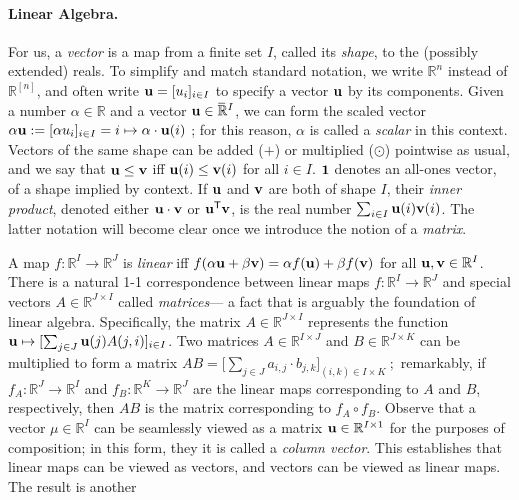 
\paragraph{Linear Algebra.}
For us, a \emph{vector} is a map from a finite set $I$, called its 
\emph{shape}, to the (possibly extended) reals.
To simplify and match standard notation, we write $\mathbb R^n$ instead of $\mathbb R^{[n]}$, and often write $\mathbf u = [u_i]_{i \in I}$ to specify a vector $\mathbf u$ by its components.
Given a number $\alpha \in \mathbb R$ and a vector $\mathbf u \in \mskip1mu\overline{\mskip-1mu\mathbb R\!}\,^I$,
    we can form the scaled vector 
    $\alpha \mathbf u := [ \alpha  u_i ]_{i \in I} = i \mapsto \mathbf \alpha \cdot \mathbf u(i)$
    \unskip;
    for this reason, $\alpha$ is called a \emph{scalar} in this context. 
Vectors of the same shape
can be added ($+$) or multiplied ($\odot$) pointwise as usual,
    and we say that $\mathbf u \le \mathbf v$ iff $\mathbf u(i) \le \mathbf v(i)$ for all $i \in I$.
$\mathbf 1$ denotes an all-ones vector, of a shape implied by context.
If $\mathbf u$ and $\mathbf v$ are both of shape $I$, their \emph{inner product}, denoted either $\mathbf u \cdot \mathbf v$ or $\mathbf u ^{\sf T} \mathbf v$,
    is the real number $\sum_{i \in I} \mathbf u(i) \mathbf v(i)$. 
The latter notation will become clear once we introduce the notion of a \emph{matrix}. 

A map $f : \mathbb R^I \to \mathbb R^J$ is \emph{linear} iff
$f( \alpha \mathbf u + \beta \mathbf v) = \alpha f(\mathbf u) + \beta f(\mathbf v)$ for all $\mathbf u, \mathbf v \in \mathbb R^I$. 
There is a natural
1-1 correspondence between linear maps $f : \mathbb R^I \to \mathbb R^J$ and
special vectors $A \in \mathbb R^{J \times I}$ called \emph{matrices}---%
    a fact that is arguably the foundation of linear algebra.
Specifically, the matrix $A \in \mathbb R^{J\times I}$ represents the function $\mathbf u \mapsto [ \sum_{j \in J} \mathbf u(j) A({j,i}) ]_{i \in I}$.
%
Two matrices $A \in \mathbb R^{I \times J}$ and $B \in \mathbb R^{J \times K}$
can be multiplied to form a matrix
$\displaystyle
    A B = \Big[ \sum_{j \in J} a_{i,j} \cdot b_{j,k} \Big]_{(i,k) \in I \times K}~;
$
remarkably, if $f_A : \mathbb R^{J} \to \mathbb R^{I}$ and $f_B : \mathbb R^{K} \to \mathbb R^J$ are the linear maps corresponding to $A$ and $B$, respectively, then
$A B$ is the matrix corresponding to $f_A \circ f_B$. 
Observe that a vector $\mu \in \mathbb R^I$ can be seamlessly viewed as
    a matrix $\mathbf u \in \mathbb R^{I \times 1}$ for the purposes of composition; in this form, they it is called a \emph{column vector}.
This establishes that linear maps can be viewed as vectors, 
    and vectors can be viewed as linear maps.
The result is another 


